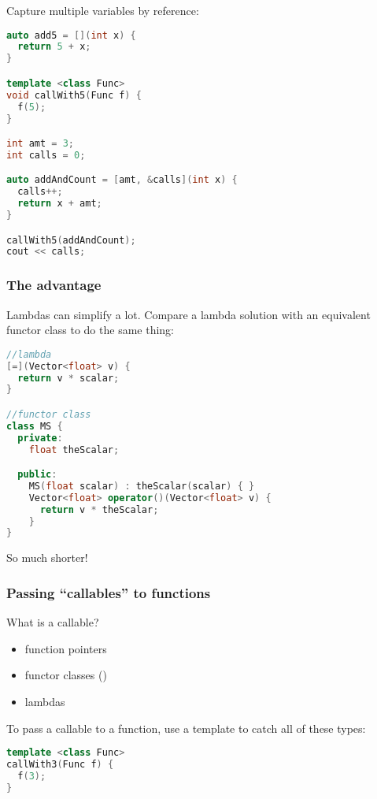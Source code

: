 Capture multiple variables by reference:

\begin{lstlisting}[language=C++]
auto add5 = [](int x) {
  return 5 + x;
}

template <class Func> 
void callWith5(Func f) {
  f(5);
}

int amt = 3;
int calls = 0;

auto addAndCount = [amt, &calls](int x) {
  calls++;
  return x + amt;
}

callWith5(addAndCount);
cout << calls;
\end{lstlisting}

\subsubsection{The advantage}

Lambdas can simplify a lot. Compare a lambda solution with an equivalent functor class to do the same thing:

\begin{lstlisting}[language=C++]
//lambda
[=](Vector<float> v) {
  return v * scalar;
}

//functor class
class MS {
  private:
    float theScalar;

  public:
    MS(float scalar) : theScalar(scalar) { }
    Vector<float> operator()(Vector<float> v) {
      return v * theScalar;
    }
}
\end{lstlisting}

So much shorter!

\subsubsection{Passing ``callables'' to functions}

What is a callable?

\begin{itemize}
  \item function pointers
  \item functor classes ()
  \item lambdas
\end{itemize}

To pass a callable to a function, use a template to catch all of these types:

\begin{lstlisting}[language=C++]
template <class Func>
callWith3(Func f) {
  f(3);
}
\end{lstlisting}